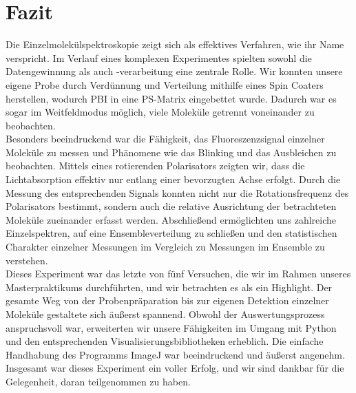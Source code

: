 \section{\label{sec:fazit}Fazit}
Die Einzelmolekülspektroskopie zeigt sich als effektives Verfahren, wie ihr Name verspricht. 
Im Verlauf eines komplexen Experimentes spielten sowohl die Datengewinnung als auch -verarbeitung eine zentrale Rolle. 
Wir konnten unsere eigene Probe durch Verdünnung und Verteilung mithilfe eines Spin Coaters herstellen, 
wodurch PBI in eine PS-Matrix eingebettet wurde. Dadurch war es sogar im Weitfeldmodus möglich, viele Moleküle getrennt voneinander zu beobachten. \\
Besonders beeindruckend war die Fähigkeit, das Fluoreszenzsignal einzelner Moleküle zu messen und Phänomene 
wie das Blinking und das Ausbleichen zu beobachten. Mittels eines rotierenden Polarisators zeigten wir, dass 
die Lichtabsorption effektiv nur entlang einer bevorzugten Achse erfolgt. Durch die Messung des entsprechenden 
Signals konnten nicht nur die Rotationsfrequenz des Polarisators bestimmt, sondern auch die relative Ausrichtung 
der betrachteten Moleküle zueinander erfasst werden. Abschließend ermöglichten uns zahlreiche Einzelspektren, 
auf eine Ensembleverteilung zu schließen und den statistischen Charakter einzelner Messungen im Vergleich zu Messungen im Ensemble zu verstehen. \\
Dieses Experiment war das letzte von fünf Versuchen, die wir im Rahmen unseres Masterpraktikums durchführten, und wir betrachten es als ein Highlight. 
Der gesamte Weg von der Probenpräparation bis zur eigenen Detektion einzelner Moleküle gestaltete sich äußerst spannend. 
Obwohl der Auswertungsprozess anspruchsvoll war, erweiterten wir unsere Fähigkeiten im Umgang mit Python und den entsprechenden 
Visualisierungsbibliotheken erheblich. Die einfache Handhabung des Programms ImageJ war beeindruckend und äußerst angenehm. \\
Insgesamt war dieses Experiment ein voller Erfolg, und wir sind dankbar für die Gelegenheit, daran teilgenommen zu haben.